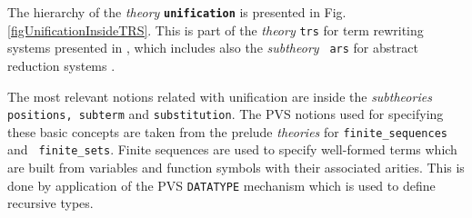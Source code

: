 \documentclass[submission,copyright,creativecommons]{eptcs}
\begin{document}
The hierarchy of the \emph{theory} {\tt\bf unification} is presented
in Fig. \ref{figUnificationInsideTRS}. This is part of the
\emph{theory} {\color{blue}\tt trs} for term rewriting systems
presented in \cite{GaAR2008b}, which includes also the \emph{subtheory} {\tt\color{blue} ars} for abstract reduction systems
\cite{GaAR2008c}.
\begin{figure*}[ht!]
  \caption{Hierarchy of {\tt unification} inside the \emph{theory}
    {\tt \color{blue} trs}}
  \label{figUnificationInsideTRS}
\end{figure*}
The most relevant notions related with unification are inside the
\emph{subtheories} {\tt positions, subterm} and {\tt substitution}.
The PVS notions used for specifying these basic concepts are taken
from the prelude \emph{theories} for {\tt finite\_sequences} and {\tt
  finite\_sets}. Finite sequences are used to specify
well-formed terms which are built from variables and function symbols
with their associated arities. This is done by application of the PVS
{\tt DATATYPE} mechanism which is used to define recursive types.
\end{document}
